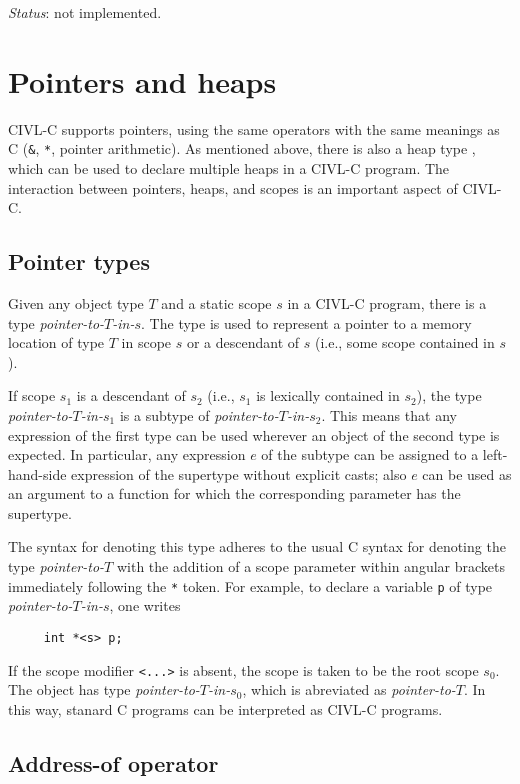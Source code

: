 \documentclass[11pt, oneside, letterpaper]{book}
\begin{document}
\emph{Status}: not implemented.

\chapter{Pointers and heaps}

CIVL-C supports pointers, using the same operators with the same
meanings as C (\texttt{\&}, \texttt{*}, pointer arithmetic).
As mentioned above, there is also a heap type \cheap{}, which can
be used to declare multiple heaps in a CIVL-C program.  The
interaction between pointers, heaps, and scopes is an important
aspect of CIVL-C.

\section{Pointer types}

Given any object type $T$ and a static scope $s$ in a CIVL-C program,
there is a type \emph{pointer-to-$T$-in-$s$}.  The type is used to
represent a pointer to a memory location of type $T$ in scope $s$ or a
descendant of $s$ (i.e., some scope contained in $s$).

If scope $s_1$ is a descendant of $s_2$ (i.e., $s_1$ is lexically
contained in $s_2$), the type \emph{pointer-to-$T$-in-$s_1$} is a
subtype of \emph{pointer-to-$T$-in-$s_2$}.  This means that any
expression of the first type can be used wherever an object of the
second type is expected.  In particular, any expression $e$ of the
subtype can be assigned to a left-hand-side expression of the
supertype without explicit casts; also $e$ can be used as an argument
to a function for which the corresponding parameter has the supertype.

The syntax for denoting this type adheres to the usual C syntax for
denoting the type \emph{pointer-to-$T$} with the addition of a scope
parameter within angular brackets immediately following the \texttt{*}
token.  For example, to declare a variable \texttt{p} of type
\emph{pointer-to-$T$-in-$s$}, one writes
\begin{verbatim}
     int *<s> p;
\end{verbatim}
If the scope modifier \texttt{<...>} is absent, the scope is taken to
be the root scope $s_0$.  The object has type
\emph{pointer-to-$T$-in-$s_0$}, which is abreviated as
\emph{pointer-to-$T$}.  In this way, stanard C programs can be
interpreted as CIVL-C programs.

\section{Address-of operator}
\end{document}
